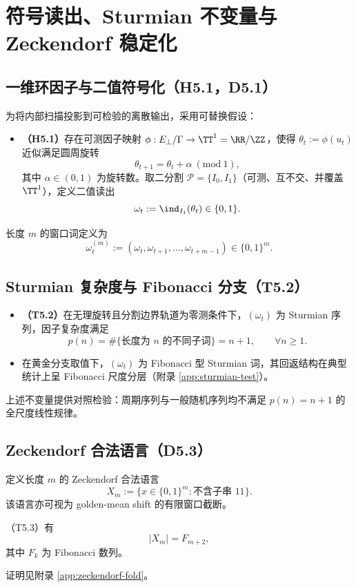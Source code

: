\section{符号读出、Sturmian 不变量与 Zeckendorf 稳定化}\label{sec:symbolic}

\subsection{一维环因子与二值符号化（H5.1，D5.1）}

为将内部扫描投影到可检验的离散输出，采用可替换假设：
\begin{itemize}
  \item \textbf{（H5.1）}存在可测因子映射 $\phi:E_{\perp}/\Gamma\to \TT^{1}=\RR/\ZZ$，使得 $\theta_t:=\phi(u_t)$ 近似满足圆周旋转
  \[
  \theta_{t+1}=\theta_t+\alpha\ (\mathrm{mod}\ 1),
  \]
  其中 $\alpha\in(0,1)$ 为旋转数。取二分割 $\mathcal{P}=\{I_0,I_1\}$（可测、互不交、并覆盖 $\TT^1$），定义二值读出
  \[
  \omega_t:=\ind_{I_1}(\theta_t)\in\{0,1\}.
  \]
\end{itemize}
长度 $m$ 的窗口词定义为
\[
\omega^{(m)}_t:=(\omega_t,\omega_{t+1},\dots,\omega_{t+m-1})\in\{0,1\}^{m}.
\]

\subsection{Sturmian 复杂度与 Fibonacci 分支（T5.2）}

\begin{itemize}
  \item \textbf{（T5.2）}在无理旋转且分割边界轨道为零测条件下，$(\omega_t)$ 为 Sturmian 序列，因子复杂度满足
  \[
  p(n)=\#\{\text{长度为 }n\text{ 的不同子词}\}=n+1,\qquad \forall n\ge 1.
  \]
  \item 在黄金分支取值下，$(\omega_t)$ 为 Fibonacci 型 Sturmian 词，其回返结构在典型统计上呈 Fibonacci 尺度分层（附录 \ref{app:sturmian-test}）。
\end{itemize}
上述不变量提供对照检验：周期序列与一般随机序列均不满足 $p(n)=n+1$ 的全尺度线性规律。

\subsection{Zeckendorf 合法语言（D5.3）}

定义长度 $m$ 的 Zeckendorf 合法语言
\[
X_m:=\{x\in\{0,1\}^{m}:\text{不含子串 }11\}.
\]
该语言亦可视为 golden-mean shift 的有限窗口截断。

\begin{proposition}[计数]\label{prop:zeckendorf-count}
（T5.3）有
\[
|X_m|=F_{m+2},
\]
其中 $F_k$ 为 Fibonacci 数列。
\end{proposition}
证明见附录 \ref{app:zeckendorf-fold}。

